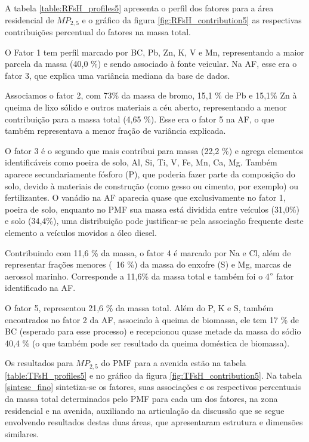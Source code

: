 A tabela \ref{table:RFsH_profiles5} apresenta o perfil dos fatores para a área
residencial de $MP_{2,5}$ e o gráfico da figura \ref{fig:RFsH_contribution5}
as respectivas contribuições percentual do fatores na massa total. 

O Fator 1 tem perfil marcado por BC, Pb, Zn, K, V e Mn, representando a maior 
parcela da massa (40,0 \%) e sendo associado à fonte veicular. 
Na AF, esse era o fator 3, que explica uma variância mediana da base de dados.

Associamos o fator 2, com 73\% da massa de bromo, 15,1 \% de Pb e 15,1\% Zn à 
queima de lixo sólido e outros materiais a céu aberto, representando a menor 
contribuição para a massa total (4,65 \%). Esse era o fator 5 na AF, o que 
também representava a menor fração de variância explicada.

O fator 3 é o segundo que mais contribui para massa (22,2 \%) e agrega elementos
identificáveis como poeira de solo, Al, Si, Ti, V, Fe, Mn, Ca, Mg. 
Também aparece secundariamente fósforo (P), que poderia fazer parte da 
composição do solo, devido à materiais de construção (como gesso ou cimento, 
por exemplo) ou fertilizantes. O vanádio na AF aparecia quase que exclusivamente
no fator 1, poeira de solo, enquanto no PMF sua massa está dividida entre 
veículos (31,0\%) e solo (34,4\%), uma distribuição pode justificar-se pela 
associação frequente deste elemento a veículos movidos a óleo diesel.

Contribuindo com 11,6 \% da massa, o fator 4 é marcado por Na e Cl, além de 
representar frações menores (~16 \%) da massa do enxofre (S) e Mg, 
marcas de aerossol marinho. Corresponde a 11,6\% da massa total e também foi o 
4$\degree$ fator identificado na AF.

O fator 5, representou  21,6 \% da massa total. Além do P, K e S, também 
encontrados no fator 2 da AF, associado à queima de biomassa, ele tem 
17 \% de BC (esperado para esse processo) e recepcionou quase metade da massa 
do sódio 40,4 \% (o que também pode ser resultado da queima doméstica de biomassa).

Os resultados para $MP_{2,5}$ do PMF para a avenida estão na tabela 
\ref{table:TFsH_profiles5} e no gráfico da figura \ref{fig:TFsH_contribution5}. 
Na tabela \ref{sintese_fino} sintetiza-se os fatores, suas associações e 
os respectivos percentuais da massa total determinados pelo PMF para cada um 
dos fatores, na zona residencial e na avenida, auxiliando na articulação da 
discussão que se segue envolvendo resultados destas duas áreas, 
que apresentaram estrutura e dimensões similares.

